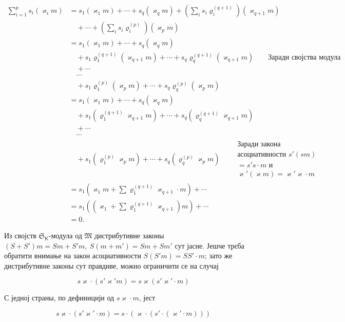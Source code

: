 \documentclass[11pt]{article}
\begin{document}
\[
\begin{aligned}
\sum_{i=1}^{p}s_i(\varkappa _i m)
&=s_1(\varkappa _1m)+\cdots+s_q(\varkappa _qm)
  +\left(\sum_i s_i\varrho_i^{(q+1)}\right)(\varkappa _{q+1}m)\\
&\quad+\cdots+\left(\sum_i s_i\varrho_i^{(p)}\right)(\varkappa _pm)\\
&=s_1(\varkappa _1m)+\cdots+s_q(\varkappa _qm)\\
&\quad+s_1\varrho_1^{(q+1)}(\varkappa _{q+1}m)+\cdots+s_q\varrho_q^{(q+1)}(\varkappa _{q+1}m)
  \qquad\text{Заради својства модула}\\
&\quad+\cdots\\
&\quad\cdots\\
&\quad+s_1\varrho_1^{(p)}(\varkappa _pm)+\cdots+s_q\varrho_q^{(p)}(\varkappa _pm)\\
&=s_1(\varkappa _1m)+\cdots+s_q(\varkappa _qm)\\
&\quad+s_1(\varrho_1^{(q+1)}\varkappa _{q+1}m)+\cdots+s_q(\varrho_q^{(q+1)}\varkappa _{q+1}m)\\
&\quad+\cdots\\
&\quad\cdots\\
&\quad+s_1(\varrho_1^{(p)}\varkappa _pm)+\cdots+s_q(\varrho_q^{(p)}\varkappa _pm)
  \qquad\begin{gathered}\text{Заради закона}\\ \text{асоциативности }s'(sm)\\ =s's\cdot m\text{ и}\\ \varkappa '(\varkappa m)=\varkappa '\varkappa \cdot m\end{gathered}\\
&=s_1\left(\varkappa _1m+\sum\varrho_1^{(q+1)}\varkappa _{q+1}\cdot m\right)+\cdots\\
&=s_1\left(\left(\varkappa _1+\sum\varrho_1^{(q+1)}\varkappa _{q+1}\right)m\right)+\cdots\\
&=0.
\end{aligned}
\]


Из својств \(\mathfrak S_{\mathsf K}\)-модула од \(\mathfrak M\) дистрибутивне законы \((S+S')m=Sm+S'm,\ S(m+m')=Sm+Sm'\) сут јасне. Јешче трєба обратити внимање на закон асоциативности \(S(S'm)=SS'\cdot m\); зато же дистрибутивне законы сут правдиве, можно ограничити се на случај

\[
s\varkappa \cdot(s'\varkappa ' m)=s\varkappa (s'\varkappa '\cdot m)
\]

С једној страны, по дефиницији од \(s\varkappa \cdot m\), јест

\[
s\varkappa \cdot(s'\varkappa '\cdot m)=s\cdot(\varkappa \cdot(s'\cdot(\varkappa '\cdot m)))
\]
\end{document}
